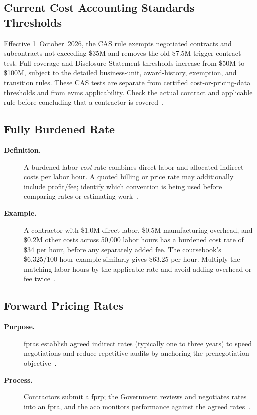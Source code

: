 \documentclass[../main.tex]{subfiles}
\begin{document}
\subsection{Current Cost Accounting Standards Thresholds}
Effective 1~October~2026, the CAS rule exempts negotiated contracts and subcontracts not exceeding \$35M and removes the old \$7.5M trigger-contract test. Full coverage and Disclosure Statement thresholds increase from \$50M to \$100M, subject to the detailed business-unit, award-history, exemption, and transition rules. These CAS tests are separate from certified cost-or-pricing-data thresholds and from \ac{evms} applicability. Check the actual contract and applicable rule before concluding that a contractor is covered~\autocite{CAS-Thresholds-2026}.

\subsection{Fully Burdened Rate}
\begin{description}
  \item[\textbf{Definition.}] A burdened labor \emph{cost} rate combines direct labor and allocated indirect costs per labor hour. A quoted billing or price rate may additionally include profit/fee; identify which convention is being used before comparing rates or estimating work~\autocite{edo-3-2-4-cost-price-evaluation-2025}.
  \item[\textbf{Example.}] A contractor with \$1.0M direct labor, \$0.5M manufacturing overhead, and \$0.2M other costs across 50,000 labor hours has a burdened cost rate of \$34 per hour, before any separately added fee. The coursebook's \$6,325/100-hour example similarly gives \$63.25 per hour. Multiply the matching labor hours by the applicable rate and avoid adding overhead or fee twice~\autocite{edo-3-2-4-cost-price-evaluation-2025}.
\end{description}

\subsection{Forward Pricing Rates}
\begin{description}
  \item[\textbf{Purpose.}] \acp{fpra} establish agreed indirect rates (typically one to three years) to speed negotiations and reduce repetitive audits by anchoring the prenegotiation objective~\autocite{edo-3-2-4-cost-price-evaluation-2025,FAR-15-407-3-FPRA}.
  \item[\textbf{Process.}] Contractors submit a \ac{fprp}; the Government reviews and negotiates rates into an \ac{fpra}, and the \ac{aco} monitors performance against the agreed rates~\autocite{edo-3-2-4-cost-price-evaluation-2025,FAR-15-407-3-FPRA}.
\end{description}
\end{document}
